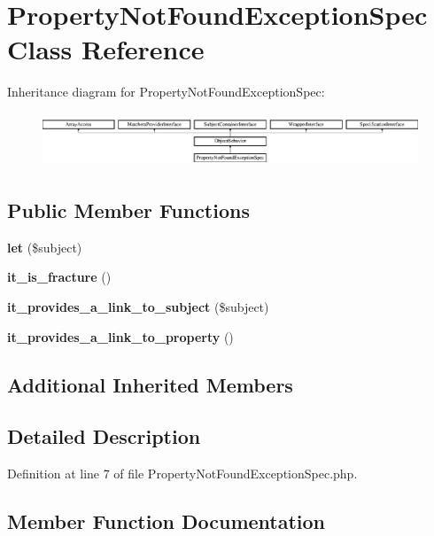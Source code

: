 \section{Property\+Not\+Found\+Exception\+Spec Class Reference}
\label{classspec_1_1_php_spec_1_1_exception_1_1_fracture_1_1_property_not_found_exception_spec}
Inheritance diagram for Property\+Not\+Found\+Exception\+Spec\+:\begin{figure}[H]
\begin{center}
\leavevmode
\includegraphics[height=1.615385cm]{classspec_1_1_php_spec_1_1_exception_1_1_fracture_1_1_property_not_found_exception_spec}
\end{center}
\end{figure}
\subsection*{Public Member Functions}
\begin{DoxyCompactItemize}
\item 
{\bf let} (\$subject)
\item 
{\bf it\+\_\+is\+\_\+fracture} ()
\item 
{\bf it\+\_\+provides\+\_\+a\+\_\+link\+\_\+to\+\_\+subject} (\$subject)
\item 
{\bf it\+\_\+provides\+\_\+a\+\_\+link\+\_\+to\+\_\+property} ()
\end{DoxyCompactItemize}
\subsection*{Additional Inherited Members}


\subsection{Detailed Description}


Definition at line 7 of file Property\+Not\+Found\+Exception\+Spec.\+php.



\subsection{Member Function Documentation}

